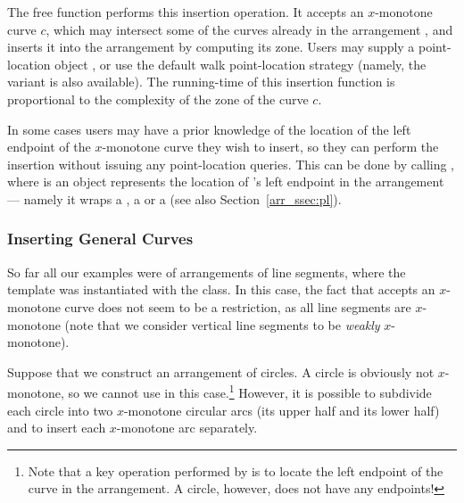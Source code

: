 The free function  performs
this insertion operation. It accepts an $x$-monotone curve $c$,
which may intersect some of the curves already in the arrangement
, and inserts it into the arrangement by computing its zone.
Users may supply a point-location object , or use the default
walk point-location strategy (namely, the variant
 is also available). The
running-time of this insertion function is proportional to the
complexity of the zone of the curve $c$.

\begin{ccAdvanced}
In some cases users may have a prior knowledge of the location of the
left endpoint of the $x$-monotone curve  they wish to insert,
so they can perform the insertion without issuing any point-location
queries. This can be done by calling
, where  is an
object represents the location of 's left endpoint in the
arrangement --- namely it wraps a , a
 or a  (see
also Section~\ref{arr_ssec:pl}).
\end{ccAdvanced}

\subsubsection{Inserting General Curves}
\label{arr_sssec:insert_gen}

So far all our examples were of arrangements of line segments,
where the  template was instantiated with the
 class. In this case, the fact that
 accepts an $x$-monotone curve does not
seem to be a restriction, as all line segments are $x$-monotone
(note that we consider vertical line segments to be {\em weakly}
$x$-monotone).

Suppose that we construct an arrangement of circles. A circle is
obviously not $x$-monotone, so we cannot use
 in this case.\footnote{Note that a key
operation performed by  is to locate the
left endpoint of the curve in the arrangement. A circle, however, does
not have any endpoints!} However, it is possible to subdivide each circle
into two $x$-monotone circular arcs (its upper half and its lower
half) and to insert each $x$-monotone arc separately.

